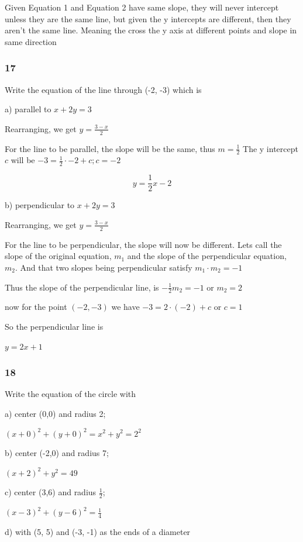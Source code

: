 \documentclass[]{report}
\begin{document}
Given Equation 1 and Equation 2 have same slope, they will never intercept unless they are the same line, but given the y intercepts are different, then they aren't the same line. Meaning the cross the y axis at different points and slope in same direction


\subsubsection{17}

Write the equation of the line through (-2, -3) which is 

a) parallel to $x + 2y = 3$

Rearranging, we get $y = \frac{3 - x}{2}$

For the line to be parallel, the slope will be the same, thus $m=\frac{1}{2}$ The y intercept $c$ will be $-3 = \frac{1}{2}\cdot -2 + c; c=-2$

\[
	y = \frac{1}{2}x -2
\]

b) perpendicular to $x + 2y = 3$

Rearranging, we get $y = \frac{3 - x}{2}$

For the line to be perpendicular, the slope will now be different. Lets call the slope of the original equation, $m_1$ and the slope of the perpendicular equation, $m_2$. And that two slopes being perpendicular satisfy $m_1\cdot m_2 = -1$

Thus the slope of the perpendicular line, is $-\frac{1}{2}m_2 = -1$ or $m_2 = 2$

now for the point $(-2, -3)$ we have $ -3 = 2 \cdot (-2) + c$ or $c = 1$

So the perpendicular line is

$y = 2x + 1$


\subsubsection{18}

Write the equation of the circle with

a) center (0,0) and radius 2;

$ (x + 0)^2 + (y+0)^2 = x^2 + y^2 = 2^2$


b) center (-2,0) and radius 7;

$(x+2)^2 +y^2 = 49$

c) center (3,6) and radius $\frac{1}{2}$;

$(x-3)^2 + (y-6)^2 = \frac{1}{4}$

d) with (5, 5) and (-3, -1) as the ends of a diameter
\end{document}
